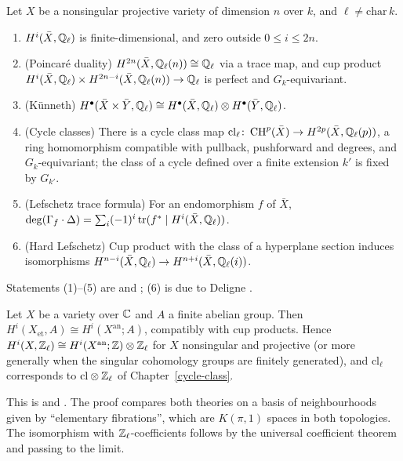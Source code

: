 \begin{theorem}\label{etale-cohomology:theorem-l-adic-properties}
Let $X$ be a nonsingular projective variety of dimension $n$ over $k$, and $\ell \neq \mathrm{char}\,k$.
\begin{enumerate}
\item $H^i(\bar X, \mathbb{Q}_\ell)$ is finite-dimensional, and zero outside $0 \leq i \leq 2n$.
\item (Poincar\'e duality) $H^{2n}(\bar X, \mathbb{Q}_\ell(n)) \cong \mathbb{Q}_\ell$ via a trace map, and cup product
$H^i(\bar X, \mathbb{Q}_\ell) \times H^{2n-i}(\bar X, \mathbb{Q}_\ell(n)) \to \mathbb{Q}_\ell$ is perfect and $G_k$-equivariant.
\item (K\"unneth) $H^\bullet(\bar X \times \bar Y, \mathbb{Q}_\ell) \cong H^\bullet(\bar X, \mathbb{Q}_\ell) \otimes H^\bullet(\bar Y, \mathbb{Q}_\ell)$.
\item (Cycle classes) There is a cycle class map $\mathrm{cl}_\ell \colon \operatorname{CH}^p(\bar X) \to H^{2p}(\bar X, \mathbb{Q}_\ell(p))$, a ring homomorphism compatible with pullback, pushforward and
degrees, and $G_k$-equivariant; the class of a cycle defined over a finite extension $k'$ is fixed by $G_{k'}$.
\item (Lefschetz trace formula) For an endomorphism $f$ of $\bar X$, $\deg(\Gamma_f \cdot \Delta) = \sum_i(-1)^i\operatorname{tr}(f^* \mid H^i(\bar X, \mathbb{Q}_\ell))$.
\item (Hard Lefschetz) Cup product with the class of a hyperplane section induces isomorphisms $H^{n-i}(\bar X, \mathbb{Q}_\ell) \to H^{n+i}(\bar X, \mathbb{Q}_\ell(i))$.
\end{enumerate}
\end{theorem}

Statements (1)--(5) are \cite[Chapter VI]{milne-etale} and \cite{sga4-half}; (6) is due to Deligne \cite{deligne-weil-2}.

\begin{theorem}\label{etale-cohomology:theorem-comparison}
Let $X$ be a variety over $\mathbb{C}$ and $A$ a finite abelian group. Then $H^i(X_{\mathrm{et}}, A) \cong H^i(X^{\mathrm{an}}; A)$, compatibly with cup products. Hence
$H^i(X, \mathbb{Z}_\ell) \cong H^i(X^{\mathrm{an}}; \mathbb{Z}) \otimes \mathbb{Z}_\ell$ for $X$ nonsingular and projective (or more generally when the singular cohomology groups are finitely generated), and
$\mathrm{cl}_\ell$ corresponds to $\mathrm{cl} \otimes \mathbb{Z}_\ell$ of Chapter~\ref{cycle-class}.
\end{theorem}

This is \cite[Expos\'e XI, Th\'eor\`eme 4.4]{sga4-3} and \cite[Chapter III]{milne-etale}. The proof compares both theories on a basis of neighbourhoods given by
``elementary fibrations'', which are $K(\pi, 1)$ spaces in both topologies. The isomorphism with $\mathbb{Z}_\ell$-coefficients follows by the universal coefficient theorem and passing to
the limit.


